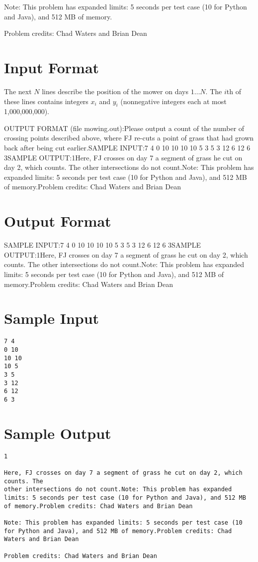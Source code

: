 \documentclass[12pt]{article}
\begin{document}
Note: This problem has expanded limits: 5 seconds per test case (10 for Python and Java), and 512 MB of memory.

Problem credits: Chad Waters and Brian Dean



\section*{Input Format}
The next $N$ lines describe the position of the mower on days $1 \ldots N$.  The
$i$th of these lines contains integers $x_i$ and $y_i$ (nonnegative integers
each at most 1,000,000,000).

OUTPUT FORMAT (file mowing.out):Please output a count of the number of crossing points described above, where FJ
re-cuts a point of grass that had grown back after being cut earlier.SAMPLE INPUT:7 4
0 10
10 10
10 5
3 5
3 12
6 12
6 3SAMPLE OUTPUT:1Here, FJ crosses on day 7 a segment of grass he cut on day 2, which counts. The
other intersections do not count.Note: This problem has expanded limits: 5 seconds per test case (10 for Python and Java), and 512 MB of memory.Problem credits: Chad Waters and Brian Dean

\section*{Output Format}
SAMPLE INPUT:7 4
0 10
10 10
10 5
3 5
3 12
6 12
6 3SAMPLE OUTPUT:1Here, FJ crosses on day 7 a segment of grass he cut on day 2, which counts. The
other intersections do not count.Note: This problem has expanded limits: 5 seconds per test case (10 for Python and Java), and 512 MB of memory.Problem credits: Chad Waters and Brian Dean

\section*{Sample Input}
\begin{verbatim}
7 4
0 10
10 10
10 5
3 5
3 12
6 12
6 3
\end{verbatim}

\section*{Sample Output}
\begin{verbatim}
1

Here, FJ crosses on day 7 a segment of grass he cut on day 2, which counts. The
other intersections do not count.Note: This problem has expanded limits: 5 seconds per test case (10 for Python and Java), and 512 MB of memory.Problem credits: Chad Waters and Brian Dean

Note: This problem has expanded limits: 5 seconds per test case (10 for Python and Java), and 512 MB of memory.Problem credits: Chad Waters and Brian Dean

Problem credits: Chad Waters and Brian Dean
\end{verbatim}
\end{document}
